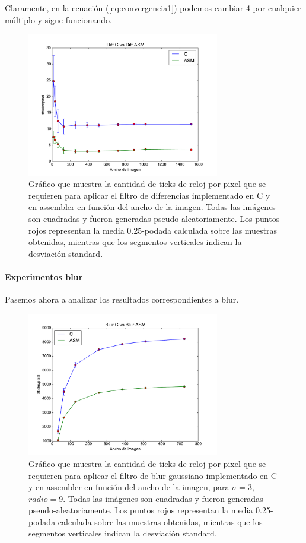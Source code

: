 Claramente, en la ecuación (\ref{eq:convergencia1}) podemos cambiar 4 por cualquier múltiplo y sigue funcionando.
\begin{figure}
 	\centering
 	\includegraphics[width=0.75\textwidth]{../graficos/diff_gcc.pdf}
	\caption{\footnotesize Gráfico que muestra la cantidad de ticks de reloj por pixel que se requieren para aplicar el filtro de diferencias implementado en C y en assembler en función del ancho de la imagen. Todas las imágenes son cuadradas y fueron generadas pseudo-aleatoriamente. Los puntos rojos representan la media 0.25-podada calculada sobre las muestras obtenidas, mientras que los segmentos verticales indican la desviación standard.}
	\label{fig:exp-diff-line}
\end{figure}

\paragraph*{Experimentos blur}
Pasemos ahora a analizar los resultados correspondientes a blur.

\begin{figure}[H]
 	\centering
 	\includegraphics[width=0.75\textwidth]{../graficos/blur_v2_lineplot_3-9.pdf}
	\caption{\footnotesize Gráfico que muestra la cantidad de ticks de reloj por pixel que se requieren para aplicar el filtro de blur gaussiano implementado en C y en assembler en función del ancho de la imagen, para $\sigma = 3$, $radio = 9$. Todas las imágenes son cuadradas y fueron generadas pseudo-aleatoriamente. Los puntos rojos representan la media 0.25-podada calculada sobre las muestras obtenidas, mientras que los segmentos verticales indican la desviación standard.}
	\label{fig:exp-blur1}
\end{figure}

